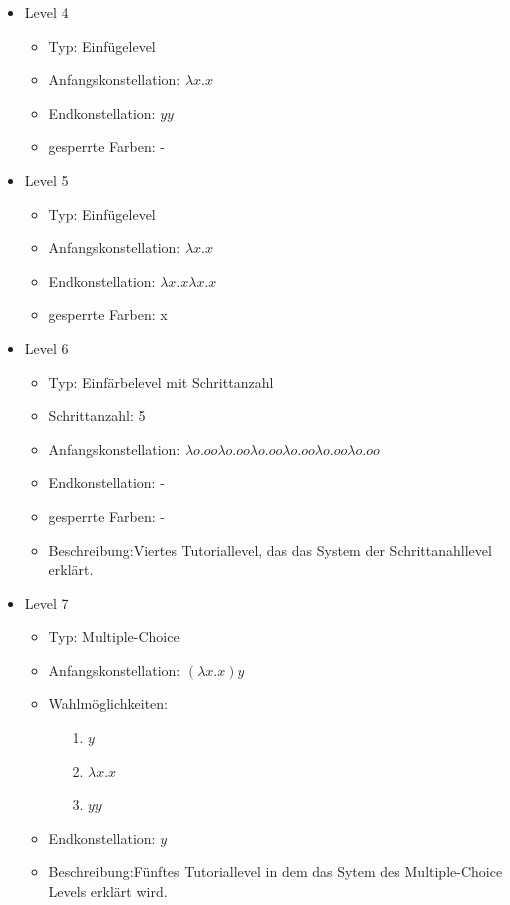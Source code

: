 \begin{itemize}
	\item{Level 4} 
		\begin{itemize}
			\item{Typ:} Einfügelevel
			\item{Anfangskonstellation:} \(\lambda x . x \)    
			\item{Endkonstellation:} \(y y\)
			\item{gesperrte Farben:} - 
		\end{itemize}

	\item{Level 5} 
		\begin{itemize}
			\item{Typ:} Einfügelevel
			\item{Anfangskonstellation:} \(\lambda x . x \)    
			\item{Endkonstellation:}  \(\lambda x . x  \lambda x . x  \)
			\item{gesperrte Farben:} x
		\end{itemize}

	\item{Level 6} 
		\begin{itemize}
			\item{Typ:} Einfärbelevel mit Schrittanzahl
			\item{Schrittanzahl:} 5
			\item{Anfangskonstellation:} \(\lambda o . o o  \lambda o . o o \lambda o . o o  \lambda o . o o \lambda o . o o  \lambda o . o o\) 
			\item{Endkonstellation:}  -
			\item{gesperrte Farben:} -
			\item{Beschreibung:}Viertes Tutoriallevel, das das System der Schrittanahllevel erklärt.
		\end{itemize}

	\item{Level 7} 
		\begin{itemize}
			\item{Typ:} Multiple-Choice 
			\item{Anfangskonstellation:} \((\lambda x . x ) y\)    
			\item{Wahlmöglichkeiten:}  
				\begin{itemize}
					\item[1.] \(y\)
					\item[2.] \(\lambda x . x \) 
					\item[3.] \(y y\)
				\end{itemize}
			\item{Endkonstellation:} \(y\)
			\item{Beschreibung:}Fünftes Tutoriallevel in dem das Sytem des Multiple-Choice Levels erklärt wird.
		\end{itemize}


\end{itemize}
